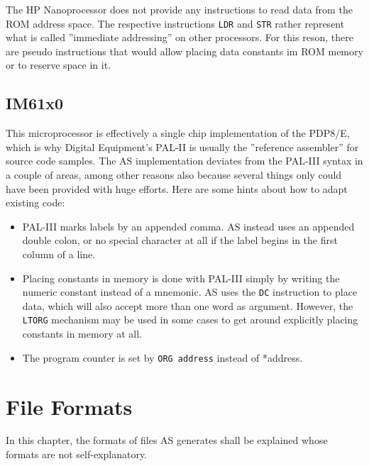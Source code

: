 \documentclass[12pt,twoside]{report}
\newcommand{\tty}[1]{{\tt #1}}
\begin{document}
The HP Nanoprocessor does not provide any instructions to read data from the ROM
address space.  The respective instructions {\tt LDR} and {\tt STR} rather
represent what is called ''immediate addressing'' on other processors.  For this
reson, there are pseudo instructions that would allow placing data constants
im ROM memory or to reserve space in it.


\section{IM61x0}

This microprocessor is effectively a single chip implementation of the PDP8/E,
which is why Digital Equipment's PAL-II is usually the ''reference assembler''
for source code samples.  The AS implementation deviates from the PAL-III syntax
in a couple of areas, among other reasons also because several things only
could have been provided with huge efforts.  Here are some hints about how to
adapt existing code:

\begin{itemize}
\item{PAL-III marks labels by an appended comma.  AS instead uses an appended
      double colon, or no special character at all if the label begins in the
      first column of a line.}
\item{Placing constants in memory is done with PAL-III simply by writing the
      numeric constant instead of a mnemonic.  AS uses the \tty{DC} instruction
      to place data, which will also accept more than one word as argument.
      However, the \tty{LTORG} mechanism may be used in some cases to get
      around explicitly placing constants in memory at all.}
\item{The program counter is set by \tty{ORG address} instead of {*address}.}
\end{itemize}


\cleardoublepage
\chapter{File Formats}

In this chapter, the formats of files AS generates shall be explained
whose formats are not self-explanatory.
\end{document}

